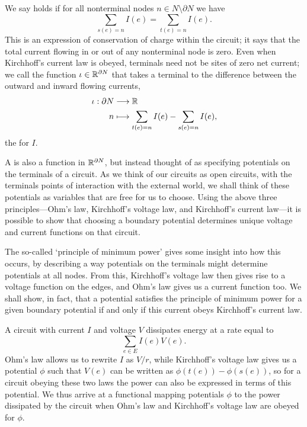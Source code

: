 We say  holds if for all nonterminal nodes $n
\in N\setminus \partial N$ we have
\[ 
\sum_{s(e) = n} I(e) = \sum_{t(e) = n} I(e).  \label{kcl}  
\]  
This is an expression of conservation of charge within the circuit; it says that
the total current flowing in or out of any nonterminal node is zero. Even when
Kirchhoff's current law is obeyed, terminals need not be sites of zero net
current; we call the function $\iota \in {\mathbb{R}}^{\partial N}$ that takes a terminal
to the difference between the outward and inward flowing currents,
\begin{align*}
\iota:\partial N &\longrightarrow {\mathbb{R}} \\
n &\longmapsto \sum_{t(e) = n} I(e) -\sum_{s(e) = n} I(e),
\end{align*}
the  for $I$.

A  is also a function in ${\mathbb{R}}^{\partial N}$, but
instead thought of as specifying potentials on the terminals of a
circuit. As we think of our circuits as open circuits, with the terminals points
of interaction with the external world, we shall think of these potentials as
variables that are free for us to choose. Using the above three
principles---Ohm's law, Kirchhoff's voltage law, and Kirchhoff's current
law---it is possible to show that choosing a boundary potential determines
unique voltage and current functions on that circuit. 

The so-called `principle of minimum power' gives some insight into how this
occurs, by describing a way potentials on the terminals might determine
potentials at all nodes. From this, Kirchhoff's voltage law then gives rise to a
voltage function on the edges, and Ohm's law gives us a current function too. We
shall show, in fact, that a potential satisfies the principle of minimum power
for a given boundary potential if and only if this current obeys Kirchhoff's
current law.

A circuit with current $I$ and voltage $V$ dissipates energy at a rate
equal to
\[
 \sum_{e \in E} I(e)V(e).
\]  
Ohm's law allows us to rewrite $I$ as $V/r$, while Kirchhoff's voltage law gives
us a potential $\phi$ such that $V(e)$ can be written as
$\phi(t(e))-\phi(s(e))$, so for a circuit obeying these two laws the power can
also be expressed in terms of this potential. We thus arrive at a functional
mapping potentials $\phi$ to the power dissipated by the circuit when Ohm's law
and Kirchhoff's voltage law are obeyed for $\phi$. 

